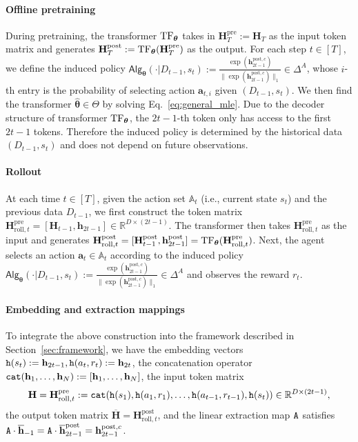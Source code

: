 \documentclass[10pt]{article}
\renewcommand{\bar}{\overline}
\newcommand{\<}{\left\langle}
\renewcommand{\>}{\right\rangle}
\newcommand{\TF}{{\rm TF}}
\newcommand{\R}{\mathbb{R}}
\newcommand{\pre}{{\mathrm{pre}}}
\newcommand{\post}{{\mathrm{post}}}
\newcommand{\partc}{{c}}
\newcommand{\state}{{s}}
\newcommand{\action}{{a}}
\newcommand{\reward}{{r}}
\newcommand{\totlen}{{T}} %
\newcommand{\cat}{{\tt cat}}
\newcommand{\extractmap}{{\tt A}}
\newcommand{\embedmap}{{\tt h}}
\newcommand{\sAlg}{{\mathsf{Alg}}}
\newcommand{\dset}{{D}}
\newcommand{\esttfpar}{{\widehat{\btheta}}}
\newcommand{\tfpar}{{\btheta}}
\newcommand{\tfparspace}{{\Theta}}
\newcommand{\roll}{{\mathrm{roll}}}
\def\sA{{\mathbb{A}}}
\def\bH{{\mathbf H}}
\def\btheta{{\boldsymbol \theta}}
\def\ba{{\mathbf a}}
\def\bh{{\mathbf h}}
\begin{document}
\paragraph{Offline pretraining} 
During pretraining, the transformer $\TF_\tfpar$ takes in   $\bH_\totlen^\pre:=\bH_\totlen$ as the input token matrix and generates $\bH_\totlen^\post:=\TF_\tfpar(\bH_\totlen^\pre)$ as the output. For each step $t\in[\totlen]$, we define the  induced policy  $\sAlg_\tfpar(\cdot|\dset_{t-1},\state_t):=\frac{\exp(\bh^{\post,\partc}_{2t-1})}{\|\exp(\bh^{\post,\partc}_{2t-1})\|_1}\in\Delta^A$, whose $i$-th entry is the probability of selecting action $\ba_{t,i}$ given $(\dset_{t-1},\state_t)$. We then find the transformer $\esttfpar\in\tfparspace$ by solving Eq.~\eqref{eq:general_mle}. 
Due to the decoder structure of transformer $\TF_\tfpar$, the $2t-1$-th token only has access to the first $2t-1$ tokens. Therefore the induced policy is  determined by the historical data $(\dset_{t-1},\state_t)$ and does not depend on future observations. 
\paragraph{Rollout}
At each time $t\in[\totlen]$, given the action set $\sA_t$ (i.e., current state $\state_t$) and the previous data $\dset_{t-1}$, we first construct the token matrix $\bH^{\pre}_{\roll,t}=[\bH_{t-1},\bh_{2t-1}]\in\R^{D\times (2t-1)}$.   The transformer then takes $\bH^{\pre}_{\roll,t}$ as the input  and generates $\bH^{\post}_{\roll,t}=[\bH^{\post}_{t-1},\bh^{\post}_{2t-1}]=\TF_\tfpar(\bH^{\pre}_{\roll,t})$. Next,  the agent selects an action $\ba_t\in\sA_t$ according to the induced  policy $\sAlg_\tfpar(\cdot|\dset_{t-1},\state_t):=\frac{\exp(\bh^{\post,\partc}_{2t-1})}{\|\exp(\bh^{\post,\partc}_{2t-1})\|_1}\in\Delta^A$ and observes the reward $r_t$.

\paragraph{Embedding and extraction mappings}
To integrate the above construction into the  framework described in Section~\ref{sec:framework},  we have the embedding vectors $\embedmap(\state_t):=\bh_{2t-1},\embedmap(\action_t,\reward_t):=\bh_{2t}$,  the concatenation operator $\cat(\bh_1, \ldots, \bh_N): = [\bh_1, \ldots, \bh_N]$, the input token matrix  $$\bH=\bH^\pre_{\roll,t}: = \cat(\embedmap(\state_1), \embedmap(\action_1, \reward_1), \ldots, \embedmap(\action_{t-1}, \reward_{t-1}), \embedmap(\state_t)) \in \R^{D \times (2t-1)},$$ the output token matrix $\bar{\bH}=\bH^\post_{\roll,t}$, and the linear extraction map $\extractmap$  satisfies $\extractmap\cdot\bar{\bh}_{-1}=\extractmap\cdot\bar{\bh}^\post_{2t-1}=\bh^{\post,\partc}_{2t-1}$. 
\end{document}
